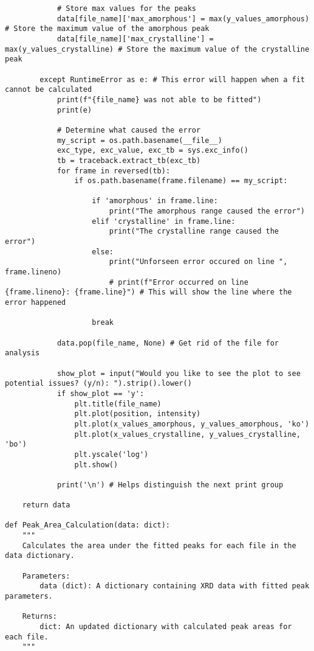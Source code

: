 \begin{small}
\begin{verbatim}
            # Store max values for the peaks
            data[file_name]['max_amorphous'] = max(y_values_amorphous)  # Store the maximum value of the amorphous peak
            data[file_name]['max_crystalline'] = max(y_values_crystalline) # Store the maximum value of the crystalline peak

        except RuntimeError as e: # This error will happen when a fit cannot be calculated
            print(f"{file_name} was not able to be fitted")
            print(e)

            # Determine what caused the error
            my_script = os.path.basename(__file__)
            exc_type, exc_value, exc_tb = sys.exc_info()
            tb = traceback.extract_tb(exc_tb)
            for frame in reversed(tb):
                if os.path.basename(frame.filename) == my_script:

                    if 'amorphous' in frame.line: 
                        print("The amorphous range caused the error")
                    elif 'crystalline' in frame.line:
                        print("The crystalline range caused the error")
                    else:
                        print("Unforseen error occured on line ", frame.lineno)
                        # print(f"Error occurred on line {frame.lineno}: {frame.line}") # This will show the line where the error happened

                    break

            data.pop(file_name, None) # Get rid of the file for analysis

            show_plot = input("Would you like to see the plot to see potential issues? (y/n): ").strip().lower()
            if show_plot == 'y':
                plt.title(file_name)
                plt.plot(position, intensity)
                plt.plot(x_values_amorphous, y_values_amorphous, 'ko')
                plt.plot(x_values_crystalline, y_values_crystalline, 'bo')
                plt.yscale('log')
                plt.show()

            print('\n') # Helps distinguish the next print group

    return data

def Peak_Area_Calculation(data: dict):
    """
    Calculates the area under the fitted peaks for each file in the data dictionary.

    Parameters:
        data (dict): A dictionary containing XRD data with fitted peak parameters.

    Returns:
        dict: An updated dictionary with calculated peak areas for each file.
    """


\end{verbatim}
\end{small}
